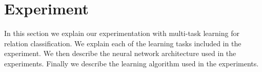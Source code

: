 \chapter{Experiment}
In this section we explain our experimentation with multi-task learning for relation classification. We explain each of the learning tasks included in the experiment. We then describe the neural network architecture used in the experiments. Finally we describe the learning algorithm used in the experiments.





